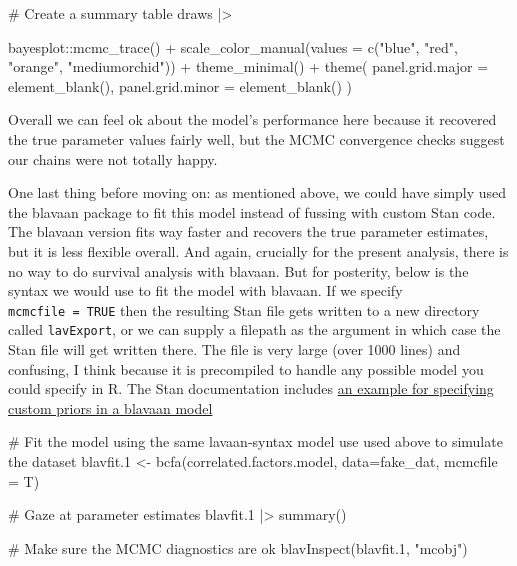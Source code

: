 \documentclass[
  letterpaper,
  DIV=11,
  numbers=noendperiod]{scrreprt}
\newenvironment{Shaded}{\begin{snugshade}}{\end{snugshade}}
\newcommand{\AttributeTok}[1]{\textcolor[rgb]{0.40,0.45,0.13}{#1}}
\newcommand{\CommentTok}[1]{\textcolor[rgb]{0.37,0.37,0.37}{#1}}
\newcommand{\FloatTok}[1]{\textcolor[rgb]{0.68,0.00,0.00}{#1}}
\newcommand{\FunctionTok}[1]{\textcolor[rgb]{0.28,0.35,0.67}{#1}}
\newcommand{\NormalTok}[1]{\textcolor[rgb]{0.00,0.23,0.31}{#1}}
\newcommand{\OtherTok}[1]{\textcolor[rgb]{0.00,0.23,0.31}{#1}}
\newcommand{\SpecialCharTok}[1]{\textcolor[rgb]{0.37,0.37,0.37}{#1}}
\newcommand{\StringTok}[1]{\textcolor[rgb]{0.13,0.47,0.30}{#1}}
\begin{document}
\begin{Shaded}
\begin{Highlighting}[]
\CommentTok{\# Create a summary table}
\NormalTok{draws }\SpecialCharTok{|\textgreater{}}

\NormalTok{  bayesplot}\SpecialCharTok{::}\FunctionTok{mcmc\_trace}\NormalTok{() }\SpecialCharTok{+} 
  \FunctionTok{scale\_color\_manual}\NormalTok{(}\AttributeTok{values =} \FunctionTok{c}\NormalTok{(}\StringTok{"blue"}\NormalTok{, }\StringTok{"red"}\NormalTok{, }\StringTok{"orange"}\NormalTok{, }\StringTok{"mediumorchid"}\NormalTok{)) }\SpecialCharTok{+} 
  \FunctionTok{theme\_minimal}\NormalTok{() }\SpecialCharTok{+}
  \FunctionTok{theme}\NormalTok{(}
    \AttributeTok{panel.grid.major =} \FunctionTok{element\_blank}\NormalTok{(),}
    \AttributeTok{panel.grid.minor =} \FunctionTok{element\_blank}\NormalTok{()}
\NormalTok{  )}
\end{Highlighting}
\end{Shaded}

Overall we can feel ok about the model's performance here because it
recovered the true parameter values fairly well, but the MCMC
convergence checks suggest our chains were not totally happy.

One last thing before moving on: as mentioned above, we could have
simply used the blavaan package to fit this model instead of fussing
with custom Stan code. The blavaan version fits way faster and recovers
the true parameter estimates, but it is less flexible overall. And
again, crucially for the present analysis, there is no way to do
survival analysis with blavaan. But for posterity, below is the syntax
we would use to fit the model with blavaan. If we specify
\texttt{mcmcfile\ =\ TRUE} then the resulting Stan file gets written to
a new directory called \texttt{lavExport}, or we can supply a filepath
as the argument in which case the Stan file will get written there. The
file is very large (over 1000 lines) and confusing, I think because it
is precompiled to handle any possible model you could specify in R. The
Stan documentation includes
\href{https://mc-stan.org/users/documentation/case-studies/sem.html\#Confirmatory_Factor_Analysis_(CFA)}{an
example for specifying custom priors in a blavaan model}

\begin{Shaded}
\begin{Highlighting}[]
\CommentTok{\# Fit the model using the same lavaan{-}syntax model use used above to simulate the dataset}
\NormalTok{blavfit}\FloatTok{.1} \OtherTok{\textless{}{-}} \FunctionTok{bcfa}\NormalTok{(correlated.factors.model, }\AttributeTok{data=}\NormalTok{fake\_dat, }\AttributeTok{mcmcfile =}\NormalTok{ T)}

\CommentTok{\# Gaze at parameter estimates}
\NormalTok{blavfit}\FloatTok{.1} \SpecialCharTok{|\textgreater{}} \FunctionTok{summary}\NormalTok{()}

\CommentTok{\# Make sure the MCMC diagnostics are ok}
\FunctionTok{blavInspect}\NormalTok{(blavfit}\FloatTok{.1}\NormalTok{, }\StringTok{"mcobj"}\NormalTok{)}
\end{Highlighting}
\end{Shaded}
\end{document}

